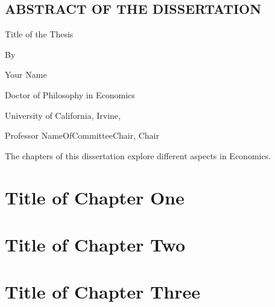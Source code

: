 \documentclass[letterpaper]{report}
\begin{document}
\clearpage
\doublespacing
\begin{center}
  \section*{ABSTRACT OF THE DISSERTATION}
  
  Title of the Thesis
  
  By
  
  Your Name
  
  Doctor of Philosophy in Economics
  
  University of California, Irvine, \the\year{}
  
  Professor NameOfCommitteeChair, Chair
\end{center}
\bigskip

The chapters of this dissertation explore different aspects in Economics. \lipsum[87-88]

\newpage
\doublespacing
\pagestyle{text}
\setcounter{page}{1}

\chapter{Title of Chapter One}


\chapter{Title of Chapter Two}


\chapter{Title of Chapter Three}


\onehalfspacing

\end{document}
